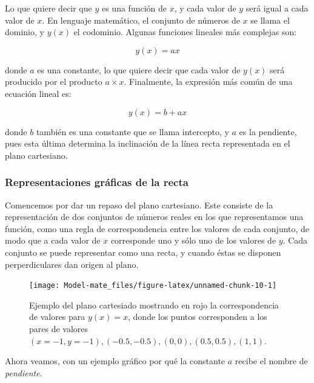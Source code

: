 \documentclass[
]{book}
\begin{document}
Lo que quiere decir que \(y\) es una función de \(x\), y cada valor de \(y\) será igual a cada valor de \(x\). En lenguaje matemático, el conjunto de números de \(x\) se llama el dominio, y \(y(x)\) el codominio. Algunas funciones lineales más complejas son:

\begin{equation}
    y(x) = ax
\end{equation}

donde \(a\) es una constante, lo que quiere decir que cada valor de \(y(x)\) será producido por el producto \(a \times x\). Finalmente, la expresión más común de una ecuación lineal es:

\begin{equation}
    y(x) = b + ax
\end{equation}

donde \(b\) también es una constante que se llama intercepto, y \(a\) es la pendiente, pues esta última determina la inclinación de la línea recta representada en el plano cartesiano.

\hypertarget{representaciones-gruxe1ficas-de-la-recta}{%
\subsubsection{Representaciones gráficas de la recta}\label{representaciones-gruxe1ficas-de-la-recta}}

Comencemos por dar un repaso del plano cartesiano. Este consiste de la representación de dos conjuntos de números reales en los que representamos una función, como una regla de correspondencia entre los valores de cada conjunto, de modo que a cada valor de \(x\) corresponde uno y sólo uno de los valores de \(y\). Cada conjunto se puede representar como una recta, y cuando éstas se disponen perperdiculares dan origen al plano.

\begin{figure}

{\centering \texttt{[image: Model-mate\_files/figure-latex/unnamed-chunk-10-1]} 

}

\caption{Ejemplo del plano cartesiado mostrando en rojo la correspondencia de valores para $y(x) = x$, donde los puntos corresponden a los pares de valores $(x = -1, y = -1), (-0.5, -0.5), (0, 0), (0.5, 0.5), (1, 1)$.}\label{fig:unnamed-chunk-10}
\end{figure}

Ahora veamos, con un ejemplo gráfico por qué la constante \(a\) recibe el nombre de \emph{pendiente}.
\end{document}
